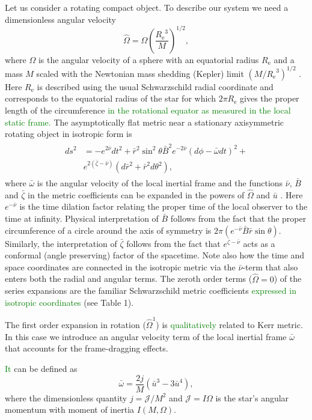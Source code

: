\documentclass{aa}
\newcommand{\be}{\begin{equation}}
\newcommand{\ee}{\end{equation}}
\newcommand{\refe}[1]{\textcolor{green}{{#1}}}
\newcommand{\refedel}[1]{}
\newcommand{\Req}{\ensuremath{R_{\mathrm{e}}}}
\newcommand{\sch}{Schwarzschild }
\newcommand{\rb}{\ensuremath{\bar{r}}}
\newcommand{\ub}{\ensuremath{\bar{u}}}
\newcommand{\wb}{\ensuremath{\bar{\omega}}}
\newcommand{\Ob}{\ensuremath{\hat{\Omega}}}
\newcommand{\nub}{\ensuremath{\bar{\nu}}}
\newcommand{\zetab}{\ensuremath{\bar{\zeta}}}
\newcommand{\Bb}{\ensuremath{\bar{B}}}
\begin{document}
Let us consider a rotating compact object.
\refedel{In addition to the dimensionless compactness parameter $u(r)$ (or $\ub(\rb)$),}To describe our system we need a dimensionless angular velocity
\be
\Ob = \Omega \left( \frac{\Req^3}{M} \right)^{1/2},
\ee
where $\Omega$ is the angular velocity of a sphere with an equatorial radius $\Req$ and a mass $M$ scaled with the Newtonian mass shedding (Kepler) limit $(M/\Req^3)^{1/2}$ \citep[see][p.29]{rcs}.  
Here $\Req$ is described using the usual \sch radial coordinate and corresponds to the equatorial radius of the star for which $2\pi\Req$ gives the proper length of the circumference \refe{in the rotational equator as measured in the local static frame.}
The asymptotically flat metric near a stationary axisymmetric rotating object in isotropic form is \citep{BW71} 
\begin{align}\begin{split} \label{eq:BWmetric}
ds^2 & = -e^{2\nub} dt^2 +
     \rb^2 \sin^2\theta \Bb^2 e^{-2\nub}(d\phi - \wb dt)^2 + \\
     & e^{2(\zetab-\nub)}(d\rb^2 + \rb^2d\theta^2),
\end{split}\end{align}
where $\wb$ is the angular velocity of the local inertial frame and the functions $\nub$, $\Bb$ and $\zetab$ in the metric coefficients can be expanded in the powers of $\Ob$ and $\ub$ \citep{BI76}.
Here $e^{-\nub}$ is the time dilation factor relating the proper time of the local observer to the time at infinity.
Physical interpretation of $\Bb$ follows from the fact that the proper circumference of a circle around the axis of symmetry is $2\pi(e^{-\nub} \Bb \rb \sin\theta)$.
Similarly, the interpretation of $\zetab$ follows from the fact that $e^{\zetab - \nub}$ acts as a conformal (angle preserving) factor of the spacetime. %
Note also how the time and space coordinates are connected in the isotropic metric via the $\nub$-term that also enters both the radial and angular terms.
The zeroth order terms ($\Ob = 0$) of the series expansions are the familiar \sch metric coefficients \refe{expressed in isotropic coordinates} (see Table 1).

The first order expansion in rotation ($\Ob^1$) is \refedel{formally}\refe{qualitatively} related to Kerr metric.
In this case we introduce an angular velocity term of the local inertial frame $\wb$ that accounts for the frame-dragging effects. 
\refedel{Up to \refe{second} order,} 
\refe{It} can be defined as
\be\label{eq:wbar}
\wb = \frac{2 j}{M} (\ub^3 - 3\ub^4),
\ee
where the dimensionless quantity $j=\mathcal{J}/M^2$ and $\mathcal{J} = I \Omega$ is the star's angular momentum with moment of inertia $I(M,\Omega)$.
\end{document}
